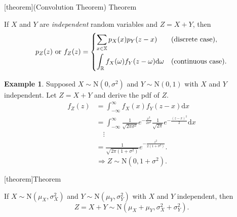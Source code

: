\documentclass[12pt]{report}
\theoremstyle{definition}
\begin{document}
[theorem]{(Convolution Theorem) Theorem}
\begin{convolution theorem}
    If $X$ and $Y$ are \emph{independent} random variables and $Z=X+Y$, then
    \[
        p_Z(z)\text{ or }f_Z(z) =
        \begin{dcases}
            \sum_{x\in\mathbb{X}}p_X(x)p_Y(z-x) & \text{(discrete case)}, \\
            \int_\mathbb{R}f_X(\omega)f_Y(z-\omega)\mathrm{d}\omega &
            \text{(continuous case)}.
        \end{dcases} 
    \]
\end{convolution theorem}

\newtheorem{Convolution theorem eg}[theorem]{Example}
\begin{Convolution theorem eg}
    Supposed $X\sim\text{N}(0,\sigma^{2})$ and $Y\sim\text{N}(0,1)$ with $X$ and
    $Y$ independent. Let $Z=X+Y$ and derive the pdf of $Z$.
    \begin{align*}
        f_Z(z)
        & = \int_{-\infty}^{\infty} f_X(x)f_Y(z-x)\mathrm{d}x \\
        & = \int_{-\infty}^{\infty}
        \frac{1}{\sqrt{2\pi\sigma^{2}}}e^{-\frac{x^{2}}{2\sigma^{2}}}
        \frac{1}{\sqrt{2\pi}}e^{-\frac{{(z-x)}^{2}}{2}}\mathrm{d}x \\
        & \quad\vdots \\
        & = \frac{1}{\sqrt{2\pi(1+\sigma^{2})}}e^{-\frac{z^{2}}{2(1+\sigma^{2})}}.
    \end{align*} 
    \[
        \Longrightarrow Z\sim\text{N}(0,1+\sigma^{2}).
    \]
\end{Convolution theorem eg}

[theorem]{Theorem}
\begin{normal distribution properties}
    If $X\sim\text{N}(\mu_X,\sigma_X^{2})$ and
    $Y\sim\text{N}(\mu_Y,\sigma^{2}_Y)$ with $X$ and $Y$ independent, then
    \[
        Z=X+Y\sim\text{N}(\mu_X+\mu_Y,\sigma_X^{2}+\sigma_Y^{2}).
    \]
\end{normal distribution properties}
\end{document}
